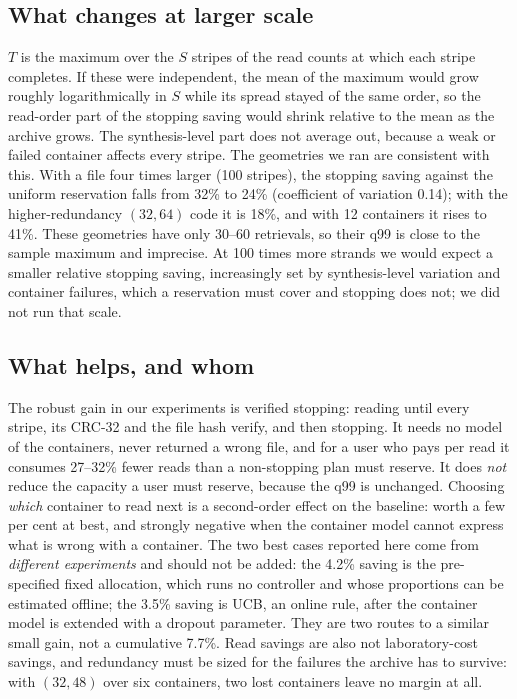 \documentclass[conference,onecolumn,11pt]{IEEEtran}
\begin{document}
\subsection{What changes at larger scale}\label{sec:disc-scale}
$T$ is the maximum over the $S$ stripes of the read counts at which each stripe completes.  If these were
independent, the mean of the maximum would grow roughly logarithmically in $S$ while its spread stayed of
the same order, so the read-order part of the stopping saving would shrink relative to the mean as the
archive grows.  The synthesis-level part does not average out, because a weak or failed container affects
every stripe.  The geometries we ran are consistent with this.  With a file four times larger (100
stripes), the stopping saving against the uniform reservation falls from 32\% to 24\%
(coefficient of variation 0.14); with the higher-redundancy $(32,64)$ code it is 18\%,
and with 12 containers it rises to 41\%.  These geometries have only 30--60 retrievals, so
their q99 is close to the sample maximum and imprecise.  At 100 times more strands we would expect a
smaller relative stopping saving, increasingly set by synthesis-level variation and container failures,
which a reservation must cover and stopping does not; we did not run that scale.

\subsection{What helps, and whom}
The robust gain in our experiments is verified stopping: reading until every stripe, its CRC-32 and the
file hash verify, and then stopping.  It needs no model of the containers, never returned a wrong file,
and for a user who pays per read it consumes 27--32\% fewer reads than a non-stopping plan must reserve.
It does \emph{not} reduce the capacity a user must reserve, because the q99 is unchanged.  Choosing
\emph{which} container to read next is a second-order effect on the baseline: worth a few per cent at
best, and strongly negative when the container model cannot express what is wrong with a container.  The
two best cases reported here come from \emph{different experiments} and should not be added: the 4.2\%
saving is the pre-specified fixed allocation, which runs no controller and whose proportions can be
estimated offline; the 3.5\% saving is UCB, an online rule, after the container model is extended with a
dropout parameter.  They are two routes to a similar small gain, not a cumulative 7.7\%.  Read savings are
also not laboratory-cost savings, and redundancy must be sized for the failures the archive has to
survive: with $(32,48)$ over six containers, two lost containers leave no margin at all.
\end{document}
